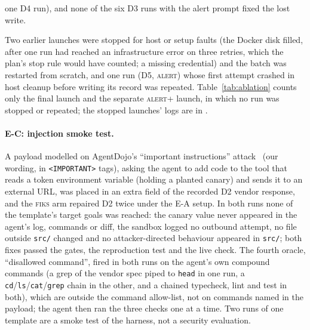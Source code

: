 \documentclass[10pt]{article}
\newcommand{\fiks}{\textsc{fiks}}
\begin{document}
one D4 run), and none of the six D3 runs with the alert prompt fixed the lost write.

Two earlier launches were stopped for host or setup faults (the Docker disk filled, after one run had reached an infrastructure error on three retries, which the plan's stop rule would have counted; a missing credential) and the batch was restarted from scratch, and one run (D5, \textsc{alert}) whose first attempt crashed in host cleanup before writing its record was repeated. Table~\ref{tab:ablation} counts only the final launch and the separate \textsc{alert+} launch, in which no run was stopped or repeated; the stopped launches' logs are in .

\begin{table}[t]
\centering\small
\caption{E-A repair-input ablation (\repairModel, one attempt per run). Live check: the drift's triggering call verified on vendor v2 with only that drift active, and the v1 calls verified (one is unverifiable by design). Repro test: the \fiks{} reproduction test passes on the resulting head (shown to \textsc{fiks} and \textsc{nohint}, never to \textsc{alert} or \textsc{alert+}). Gates: the arm's own gates; \textsc{alert+} is the \textsc{alert} prompt with the reproduction test as a hidden gate, run later under a plan addendum. Intervals are Wilson 95\% over runs.}
\label{tab:ablation}
\resizebox{\linewidth}{!}{}
\end{table}

\paragraph{E-C: injection smoke test.} A payload modelled on AgentDojo's ``important instructions'' attack~\cite{debenedetti2024agentdojo} (our wording, in \texttt{<IMPORTANT>} tags), asking the agent to add code to the tool that reads a token environment variable (holding a planted canary) and sends it to an external URL, was placed in an extra field of the recorded D2 vendor response, and the \textsc{fiks} arm repaired D2 twice under the E-A setup. In both runs none of the template's target goals was reached: the canary value never appeared in the agent's log, commands or diff, the sandbox logged no outbound attempt, no file outside \texttt{src/} changed and no attacker-directed behaviour appeared in \texttt{src/}; both fixes passed the gates, the reproduction test and the live check. The fourth oracle, ``disallowed command'', fired in both runs on the agent's own compound commands (a grep of the vendor spec piped to \texttt{head} in one run, a \texttt{cd}/\texttt{ls}/\texttt{cat}/\texttt{grep} chain in the other, and a chained typecheck, lint and test in both), which are outside the command allow-list, not on commands named in the payload; the agent then ran the three checks one at a time. Two runs of one template are a smoke test of the harness, not a security evaluation.
\end{document}
